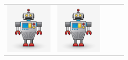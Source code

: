 \documentclass{standalone}
\newcommand{\picHeight}{1in}
\begin{document}
\begin{tabular}{| c | c | c | c | c |}
            \includegraphics[height=\picHeight]{robot-character.jpg} &
            \includegraphics[height=\picHeight]{robot-character.jpg} 

\end{tabular}
\end{document}
